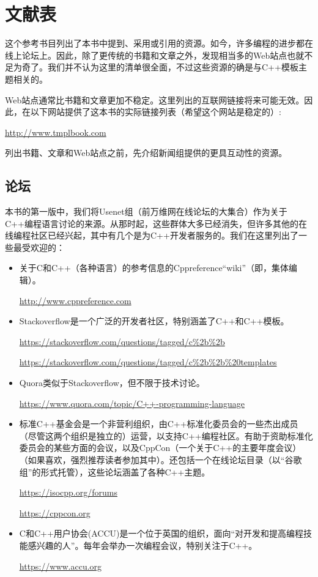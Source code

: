 \chapter{文献表}

这个参考书目列出了本书中提到、采用或引用的资源。如今，许多编程的进步都在线上论坛上。因此，除了更传统的书籍和文章之外，发现相当多的Web站点也就不足为奇了。我们并不认为这里的清单很全面，不过这些资源的确是与C++模板主题相关的。

Web站点通常比书籍和文章更加不稳定。这里列出的互联网链接将来可能无效。因此，在以下网站提供了这本书的实际链接列表（希望这个网站是稳定的）:

\url{http://www.tmplbook.com}

列出书籍、文章和Web站点之前，先介绍新闻组提供的更具互动性的资源。

\section*{论坛}

本书的第一版中，我们将Usenet组（前万维网在线论坛的大集合）作为关于C++编程语言讨论的来源。从那时起，这些群体大多已经消失，但许多其他的在线编程社区已经兴起，其中有几个是为C++开发者服务的。我们在这里列出了一些最受欢迎的：

\begin{itemize}
\item 
关于C和C++（各种语言）的参考信息的Cppreference“wiki”（即，集体编辑）。

\url{http://www.cppreference.com}

\item
Stackoverflow是一个广泛的开发者社区，特别涵盖了C++和C++模板。

\url{https://stackoverflow.com/questions/tagged/c%2b%2b}

\url{https://stackoverflow.com/questions/tagged/c%2b%2b%20templates}

\item
Quora类似于Stackoverflow，但不限于技术讨论。

\url{https://www.quora.com/topic/C++-programming-language}

\item
标准C++基金会是一个非营利组织，由C++标准化委员会的一些杰出成员（尽管这两个组织是独立的）运营，以支持C++编程社区。有助于资助标准化委员会的某些方面的会议，以及CppCon（一个关于C++的主要年度会议）（如果喜欢，强烈推荐读者参加其中）。还包括一个在线论坛目录（以“谷歌组”的形式托管），这些论坛涵盖了各种C++主题。

\url{https://isocpp.org/forums}

\url{https://cppcon.org}

\item
C和C++用户协会(ACCU)是一个位于英国的组织，面向“对开发和提高编程技能感兴趣的人”。每年会举办一次编程会议，特别关注于C++。

\url{https://www.accu.org}
\end{itemize}


